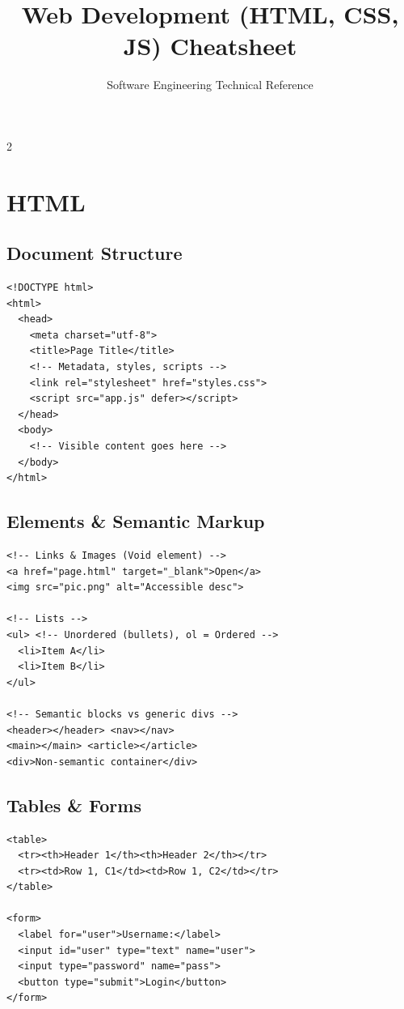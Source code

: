 \documentclass{article}
\title{Web Development (HTML, CSS, JS) Cheatsheet}
\author{Software Engineering Technical Reference}
\date{}
\begin{document}

\begin{multicols}{2}

\section{HTML}

\subsection{Document Structure}
\begin{lstlisting}[style=htmlexam]
<!DOCTYPE html>
<html>
  <head>
    <meta charset="utf-8">
    <title>Page Title</title>
    <!-- Metadata, styles, scripts -->
    <link rel="stylesheet" href="styles.css">
    <script src="app.js" defer></script>
  </head>
  <body>
    <!-- Visible content goes here -->
  </body>
</html>
\end{lstlisting}

\subsection{Elements \& Semantic Markup}
\begin{lstlisting}[style=htmlexam]
<!-- Links & Images (Void element) -->
<a href="page.html" target="_blank">Open</a>
<img src="pic.png" alt="Accessible desc">

<!-- Lists -->
<ul> <!-- Unordered (bullets), ol = Ordered -->
  <li>Item A</li>
  <li>Item B</li>
</ul>

<!-- Semantic blocks vs generic divs -->
<header></header> <nav></nav>
<main></main> <article></article>
<div>Non-semantic container</div>
\end{lstlisting}

\subsection{Tables \& Forms}
\begin{lstlisting}[style=htmlexam]
<table>
  <tr><th>Header 1</th><th>Header 2</th></tr>
  <tr><td>Row 1, C1</td><td>Row 1, C2</td></tr>
</table>

<form>
  <label for="user">Username:</label>
  <input id="user" type="text" name="user">
  <input type="password" name="pass">
  <button type="submit">Login</button>
</form>
\end{lstlisting}


\end{multicols}
\end{document}
